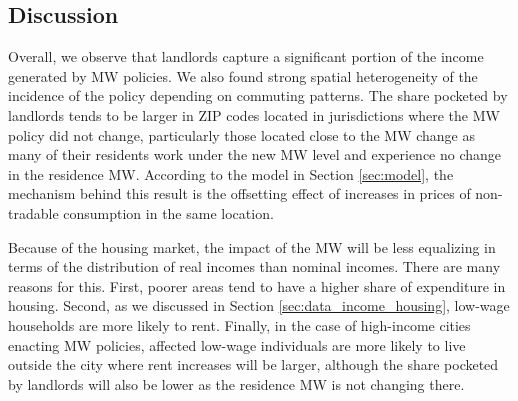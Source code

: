 \subsection{Discussion}\label{sec:discussion_cf}

Overall, we observe that landlords capture a significant portion of the income 
generated by MW policies.
We also found strong spatial heterogeneity of the incidence of the policy 
depending on commuting patterns.
The share pocketed by landlords tends to be larger in ZIP codes located in 
jurisdictions where the MW policy did not change,
particularly those located close to the MW change as many of their residents
work under the new MW level and experience no change in the residence MW.
According to the model in Section \ref{sec:model}, the mechanism behind
this result is the offsetting effect of increases in prices of non-tradable 
consumption in the same location.

Because of the housing market, 
the impact of the MW will be less equalizing in terms of the distribution of
real incomes than nominal incomes.
There are many reasons for this.
First, poorer areas tend to have a higher share of expenditure in housing.
Second, as we discussed in Section \ref{sec:data_income_housing},
low-wage households are more likely to rent.
Finally, in the case of high-income cities enacting MW policies, affected 
low-wage individuals are more likely to live outside the city where rent
increases will be larger, although the share pocketed by landlords will 
also be lower as the residence MW is not changing there.

